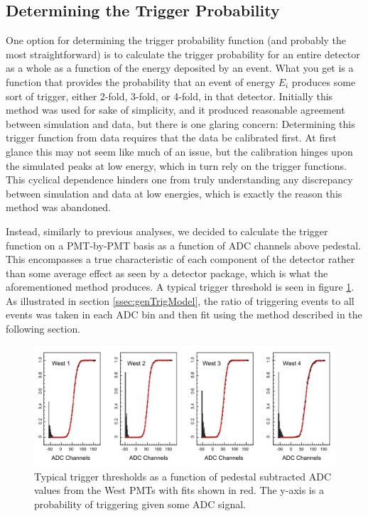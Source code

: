 \subsection{Determining the Trigger Probability}
One option for determining the trigger probability function (and probably the 
most straightforward) is to calculate the trigger probability for an entire detector as 
a whole as a function of the energy deposited by an event. What you get is a 
function that provides the probability that an event of energy $ E_i $ 
produces some sort of trigger, either 2-fold, 3-fold, or 4-fold, in that 
detector. Initially this method was used for sake of simplicity, and it produced 
reasonable agreement between simulation and data, but there is one 
glaring concern: Determining this trigger function from data requires that the data be 
calibrated first. At first glance this may not seem like much of an issue, but the 
calibration hinges upon the 
simulated peaks at low energy, which in turn rely on the trigger functions. This 
cyclical dependence hinders one from truly understanding any discrepancy between 
simulation and data at low energies, which is exactly the reason this method was 
abandoned.  

Instead, similarly to previous analyses, we decided to calculate the trigger
function on a PMT-by-PMT basis as a function of ADC channels above pedestal. This
encompasses a true characteristic of each component of the detector rather than some
average effect as seen by a detector package, which is what the aforementioned 
method produces. A typical trigger threshold is seen in figure \ref{fig:trigger_thresh}.
As illustrated in section \ref{ssec:genTrigModel}, the ratio of triggering events
to all events was taken in each ADC bin and then fit using the method described
in the following section.
  

\begin{figure}[h] 
\centering
\includegraphics[scale=.6]{3-UCNAAnalysis/triggerThresholds.pdf}
\caption{Typical trigger thresholds as a function of pedestal subtracted
  ADC values from the West PMTs with fits shown in red. The y-axis
  is a probability of triggering given some ADC signal.}
\label{fig:trigger_thresh}
\end{figure}

